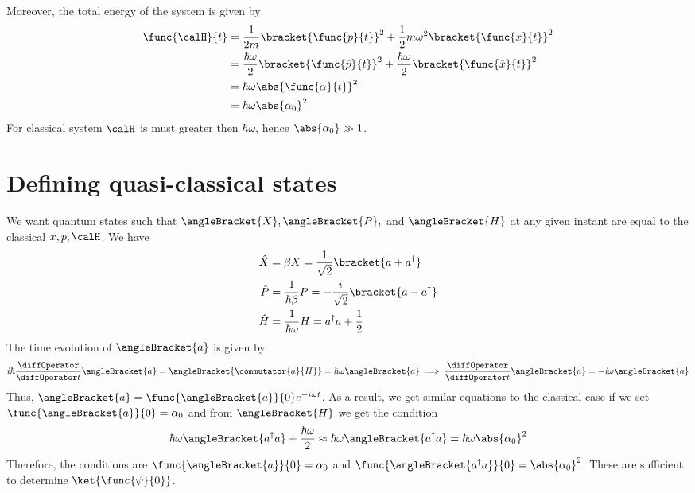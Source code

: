 Moreover, the total energy of the system is given by
\begin{align*}
    \func{\calH}{t} &= \dfrac{1}{2m} \bracket{\func{p}{t}}^2+ \dfrac{1}{2}m\omega^2 \bracket{\func{x}{t}}^2 \\
    &= \dfrac{\hbar \omega}{2} \bracket{\func{\hat{p}}{t}}^2 + \dfrac{\hbar \omega}{2} \bracket{\func{\hat{x}}{t}}^2\\
    &= \hbar \omega \abs{\func{\alpha}{t}}^2 \\
    &= \hbar \omega \abs{\alpha_0}^2
\end{align*}
For classical system \(\calH\) is must greater then \(\hbar \omega\), hence \(\abs{\alpha_0} \gg 1\).
\section{Defining quasi-classical states}
We want quantum states such that \(\angleBracket{X}, \angleBracket{P},\) and \(\angleBracket{H}\) at any given instant are equal to the classical \(x,p,\calH\). We have 
\begin{align*}
    \hat{X} &= \beta X = \dfrac{1}{\sqrt{2}} \bracket{a + a^{\dagger}}\\
    \hat{P} &= \frac{1}{\hbar \beta} P = -\dfrac{i}{\sqrt{2}} \bracket{a - a^{\dagger}}\\
    \hat{H} &= \frac{1}{\hbar \omega} H = a^{\dagger} a + \frac{1}{2}
\end{align*}
The time evolution of \(\angleBracket{a}\) is given by 
\begin{equation*}
    i \hbar \dfrac{\diffOperator}{\diffOperator t} \angleBracket{a} = \angleBracket{\commutator{a}{H}} = \hbar \omega \angleBracket{a} \implies \dfrac{\diffOperator}{\diffOperator t} \angleBracket{a} = - i \omega \angleBracket{a}
\end{equation*}
Thus, \(\angleBracket{a} = \func{\angleBracket{a}}{0}e^{-i\omega t}\). As a result, we get similar equations to the classical case if we set \(\func{\angleBracket{a}}{0} = \alpha_0\) and from \(\angleBracket{H}\) we get the condition 
\begin{equation*}
    \hbar \omega \angleBracket{a^{\dagger}a} + \frac{\hbar \omega}{2} \approx \hbar \omega \angleBracket{a^{\dagger}a} = \hbar \omega \abs{\alpha_0}^2
\end{equation*}
Therefore, the conditions are \(\func{\angleBracket{a}}{0} = \alpha_0\) and \(\func{\angleBracket{a^{\dagger}a}}{0} = \abs{\alpha_0}^2\). These are sufficient to determine \(\ket{\func{\psi}{0}}\).

